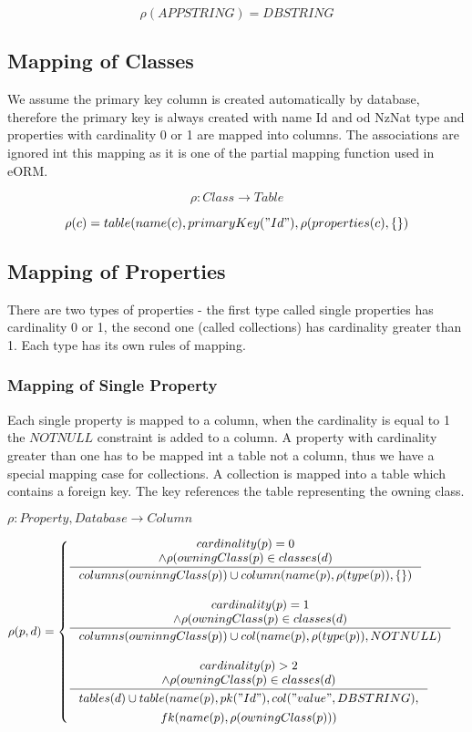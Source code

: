 \documentclass[11pt]{article}
\begin{document}
$$
\rho(APPSTRING) = DBSTRING
$$


\subsection{Mapping of Classes}
We assume the primary key column is created automatically by database, therefore the primary key is always created with name Id and od NzNat type and properties with cardinality 0 or 1 are mapped into columns. The associations are ignored int this mapping as it is one of the partial mapping function used in eORM.

$$
\rho : Class \rightarrow Table
$$

$$
\rho(c) = table(name(c), primaryKey("Id"), \rho(properties(c), \{ \})
$$

\subsection{Mapping of Properties}
There are two types of properties - the first type called single properties has cardinality 0 or 1, the second one (called collections) has cardinality greater than 1. Each type has its own rules of mapping.

\subsubsection{Mapping of Single Property}
Each single property is mapped to a column, when the cardinality is equal to 1 the $NOTNULL$ constraint is added to a column. A property with cardinality greater than one has to be mapped int a table not a column, thus we have a special mapping case for collections. A collection is mapped into a table which contains a foreign key. The key references the table representing the owning class.



$
\rho : Property, Database \rightarrow Column 
$

$\rho(p, d) = \begin{cases}
 \inference{cardinality(p) = 0 \\ \wedge \rho(owningClass(p) \in classes(d)}{columns(owninngClass(p)) \cup column(name(p), \rho(type(p)), \{ \})} \\ \\
 
 \inference{cardinality(p) = 1 \\ \wedge \rho(owningClass(p) \in classes(d)}{columns(owninngClass(p)) \cup col(name(p), \rho(type(p)), NOTNULL)} \\ \\
 
 \inference{cardinality(p) > 2 \\ \wedge \rho(owningClass(p) \in classes(d)}{\begin{gathered} tables(d) \cup table(name(p), pk("Id"), col("value", DBSTRING), \\ fk(name(p), \rho(owningClass(p))) \end{gathered}}
 \end{cases}$
\end{document}
